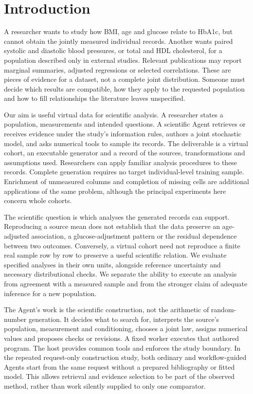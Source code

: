 \documentclass[11pt,letterpaper]{article}
\begin{document}
\section{Introduction}

A researcher wants to study how BMI, age and glucose relate to HbA1c, but cannot obtain the jointly measured individual records. Another wants paired systolic and diastolic blood pressures, or total and HDL cholesterol, for a population described only in external studies. Relevant publications may report marginal summaries, adjusted regressions or selected correlations. These are pieces of evidence for a dataset, not a complete joint distribution. Someone must decide which results are compatible, how they apply to the requested population and how to fill relationships the literature leaves unspecified.


Our aim is useful virtual data for scientific analysis. A researcher states a population, measurements and intended questions. A scientific Agent retrieves or receives evidence under the study's information rules, authors a joint stochastic model, and asks numerical tools to sample its records. The deliverable is a virtual cohort, an executable generator and a record of the sources, transformations and assumptions used. Researchers can apply familiar analysis procedures to these records. Complete generation requires no target individual-level training sample. Enrichment of unmeasured columns and completion of missing cells are additional applications of the same problem, although the principal experiments here concern whole cohorts.


The scientific question is which analyses the generated records can support. Reproducing a source mean does not establish that the data preserve an age-adjusted association, a glucose-adjustment pattern or the residual dependence between two outcomes. Conversely, a virtual cohort need not reproduce a finite real sample row by row to preserve a useful scientific relation. We evaluate specified analyses in their own units, alongside reference uncertainty and necessary distributional checks. We separate the ability to execute an analysis from agreement with a measured sample and from the stronger claim of adequate inference for a new population.


The Agent's work is the scientific construction, not the arithmetic of random-number generation. It decides what to search for, interprets the source's population, measurement and conditioning, chooses a joint law, assigns numerical values and proposes checks or revisions. A fixed worker executes that authored program. The host provides common tools and enforces the study boundary. In the repeated request-only construction study, both ordinary and workflow-guided Agents start from the same request without a prepared bibliography or fitted model. This allows retrieval and evidence selection to be part of the observed method, rather than work silently supplied to only one comparator.
\end{document}
